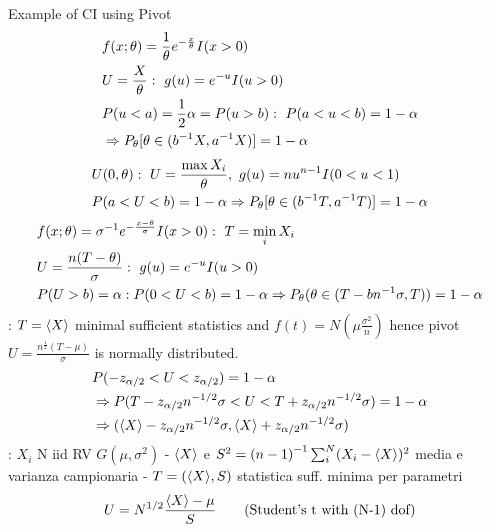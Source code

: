 \documentclass[asd-beamer.tex]{subfiles}%
\begin{document}
\begin{frame}[allowframebreaks]{Example of CI using Pivot}
	\begin{align*}
	&f(x;\theta)=\frac{1}{\theta}\exp{-\frac{x}{\theta}}I(x>0)\\
	&U=\frac{X}{\theta}:\ g(u)=\exp{-u}I(u>0)\\
	&P(u<a)=\frac{1}{2}\alpha=P(u>b):\ P(a<u<b)=1-\alpha\\
	&\Rightarrow P_{\theta}[\theta\in(\invers{b}X,\invers{a}X)]=1-\alpha
	\end{align*}
	\begin{align*}
	&U(0,\theta):\ U=\frac{\max X_i}{\theta},\ g(u)=nu^{n-1}I(0<u<1)\\
	&P(a<U<b)=1-\alpha\Rightarrow P_{\theta}[\theta\in(\invers{b}T,\invers{a}T)]=1-\alpha
	\end{align*}
	\begin{align*}
	&f(x;\theta)=\invers{\sigma}\exp{-\frac{x-\theta}{\sigma}}I(x>0):\ T=\min_iX_i\\
	&U=\frac{n(T-\theta)}{\sigma}:\ g(u)=\exp{-u}I(u>0)\\
	&P(U>b)=\alpha: P(0<U<b)=1-\alpha\Rightarrow P_{\theta}(\theta\in(T-b\invers{n}\sigma,T))=1-\alpha
	\end{align*}
	: $T=\langle X \rangle$ minimal sufficient statistics and $f(t)=N(\mu\frac{\sigma^2}{n})$ hence pivot $U=\frac{n^{\frac{1}{2}}(T-\mu)}{\sigma}$ is normally distributed.
	\begin{align*}
	&P(-z_{\alpha/2}<U<z_{\alpha/2})=1-\alpha\\
	&\Rightarrow P(T-z_{\alpha/2}n^{-1/2}\sigma<U<T+z_{\alpha/2}n^{-1/2}\sigma)=1-\alpha\\
	&\Rightarrow(\langle X \rangle-z_{\alpha/2}n^{-1/2}\sigma,\langle X \rangle+z_{\alpha/2}n^{-1/2}\sigma)
	\end{align*}
	: $X_i$ N iid RV $G(\mu,\sigma^2)$ - $\langle X \rangle$ e $S^2={(n-1)}^{-1}\sum_i^N(X_i-\langle X \rangle)^2$ media e varianza campionaria - $T=(\langle X \rangle,S)$ statistica suff. minima per parametri
	\begin{align*}
	&U=N^{1/2}\frac{\exv{X}-\mu}{S}\tag{Student's t with (N-1) dof}\\

\end{align*}
\end{frame}
\end{document}
